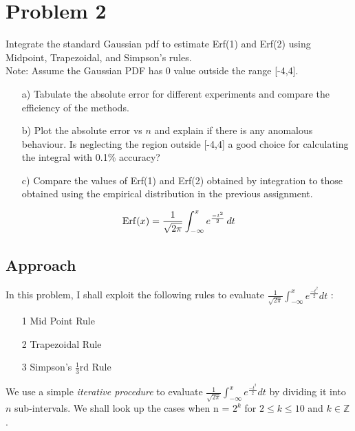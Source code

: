 \documentclass[titlepage, 11pt]{article}
\begin{document}
\newpage
% 
% 
\section{Problem 2}
Integrate the standard Gaussian pdf to estimate {Erf(1)} and {Erf(2)} using Midpoint, Trapezoidal, and Simpson’s rules.\\
Note: Assume the Gaussian PDF has 0 value outside the range [-4,4].
\begin{itemize}
  \item [a)]Tabulate the absolute error for different experiments and compare the efficiency of the methods.
  \item [b)]Plot the absolute error vs $n$ and explain if there is any anomalous behaviour. Is neglecting the region outside [-4,4] a good choice for calculating the integral with 0.1\% accuracy?
  \item [c)]Compare the values of {Erf(1)} and {Erf(2)} obtained by integration to those obtained using the empirical distribution in the previous assignment.
\end{itemize}   

\begin{align}
    {\rm Erf}(x) = \frac{1}{\sqrt{2\pi}}\int_{-\infty}^{x}e^{\frac{-t^2}{2}}\,dt
\end{align} 

\subsection{Approach}

In this problem, I shall exploit the following rules to evaluate  
$\frac{1}{\sqrt{2\pi}} \int_{-\infty}^{x} e^{\frac{-t^2}{2}} dt$ :
\begin{itemize}
    \item [1] Mid Point Rule 
    \item [2] Trapezoidal Rule 
    \item [3] Simpson's $\frac{1}{3}$rd Rule 
\end{itemize}

We use a simple \textit{iterative procedure} to evaluate  
$\frac{1}{\sqrt{2\pi}} \int_{-\infty}^{x} e^{\frac{-t^2}{2}} dt$ by dividing it into $n$ sub-intervals. 
We shall look up the cases when n = $2^k$ for $2 \leq k \leq 10$ and $k \in \mathbb{Z}$. 
\end{document}
